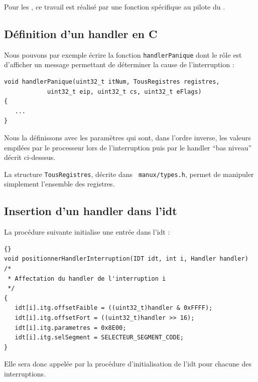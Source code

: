    Pour les \irq, ce travail est réalisé par une fonction spécifique
au pilote du \pic.
   
%      
\subsection{Définition d'un handler en C}

   Nous pouvons par exemple écrire la fonction
\lstinline!handlerPanique! dont le rôle est d'afficher un message
permettant de déterminer la cause de l'interruption :

\begin{lstlisting}
void handlerPanique(uint32_t itNum, TousRegistres registres,
		    uint32_t eip, uint32_t cs, uint32_t eFlags)
{
   ...
}
\end{lstlisting}

   Nous la définissons avec les paramètres qui sont, dans l'ordre
inverse, les valeurs empilées par le processeur lors de l'interruption
puis par le handler ``bas niveau'' décrit ci-desssus.

   La structure \lstinline!TousRegistres!, décrite dans {\tt
manux/types.h}, permet de manipuler simplement l'ensemble des
registres.
   
%      
\subsection{Insertion d'un handler dans l'{\sc idt}}

   La procédure suivante initialise une entrée dans l'{\sc idt} :

\begin{lstlisting}{}
void positionnerHandlerInterruption(IDT idt, int i, Handler handler)
/*
 * Affectation du handler de l'interruption i
 */
{
   idt[i].itg.offsetFaible = ((uint32_t)handler & 0xFFFF);
   idt[i].itg.offsetFort = ((uint32_t)handler >> 16);
   idt[i].itg.parametres = 0x8E00;
   idt[i].itg.selSegment = SELECTEUR_SEGMENT_CODE;
}

\end{lstlisting}

   Elle sera donc appelée par la procédure d'initialisation de l'{\sc idt} pour
chacune des interruptions.

